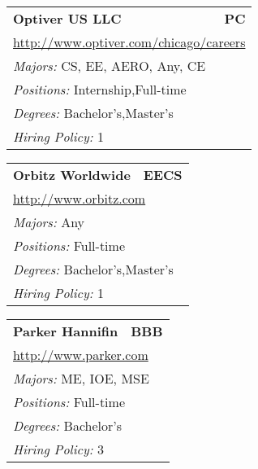 \documentclass[twoside]{article}
\begin{document}
\begin{center}
\begin{multicols}{3}
\begin{FlushLeft}
\begin{minipage}{\columnwidth}
\end{minipage}
 
\begin{minipage}{\columnwidth}\begin{tabularx}{.95\columnwidth}{Xr}
                 {\Large\bf Optiver US LLC} & {\Large\bf PC}\\
    \multicolumn{2}{p{.95\columnwidth}}{\url{http://www.optiver.com/chicago/careers}}\\
    \multicolumn{2}{p{.95\columnwidth}}{\emph{Majors:} CS, EE, AERO, Any, CE}\\
    \multicolumn{2}{p{.95\columnwidth}}{\emph{Positions:} Internship,Full-time}\\
    \multicolumn{2}{p{.95\columnwidth}}{\emph{Degrees:} Bachelor's,Master's}\\
    \multicolumn{2}{p{.95\columnwidth}}{\emph{Hiring Policy:} 1}\\
    \end{tabularx}
    
\end{minipage}
 
\begin{minipage}{\columnwidth}\begin{tabularx}{.95\columnwidth}{Xr}
                 {\Large\bf Orbitz Worldwide} & {\Large\bf EECS}\\
    \multicolumn{2}{p{.95\columnwidth}}{\url{http://www.orbitz.com}}\\
    \multicolumn{2}{p{.95\columnwidth}}{\emph{Majors:} Any}\\
    \multicolumn{2}{p{.95\columnwidth}}{\emph{Positions:} Full-time}\\
    \multicolumn{2}{p{.95\columnwidth}}{\emph{Degrees:} Bachelor's,Master's}\\
    \multicolumn{2}{p{.95\columnwidth}}{\emph{Hiring Policy:} 1}\\
    \end{tabularx}
    
\end{minipage}
 
\begin{minipage}{\columnwidth}\begin{tabularx}{.95\columnwidth}{Xr}
                 {\Large\bf Parker Hannifin} & {\Large\bf BBB}\\
    \multicolumn{2}{p{.95\columnwidth}}{\url{http://www.parker.com}}\\
    \multicolumn{2}{p{.95\columnwidth}}{\emph{Majors:} ME, IOE, MSE}\\
    \multicolumn{2}{p{.95\columnwidth}}{\emph{Positions:} Full-time}\\
    \multicolumn{2}{p{.95\columnwidth}}{\emph{Degrees:} Bachelor's}\\
    \multicolumn{2}{p{.95\columnwidth}}{\emph{Hiring Policy:} 3}\\
    \end{tabularx}
    

\end{minipage}
\end{FlushLeft}
\end{multicols}
\end{center}
\end{document}

